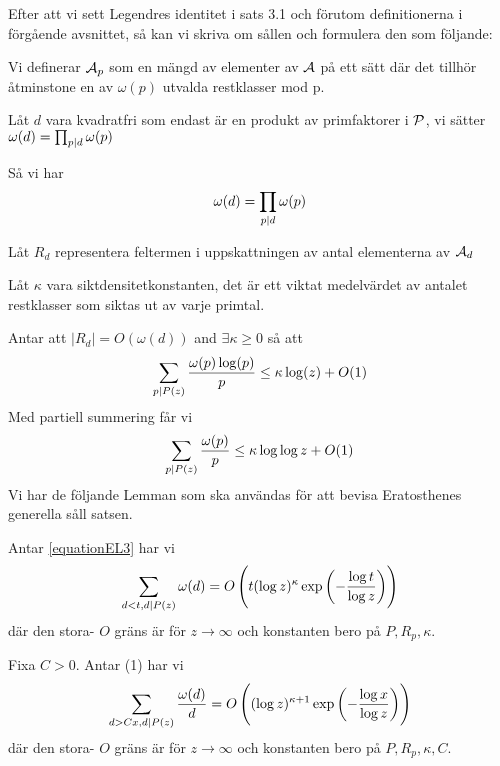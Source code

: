 Efter att vi sett Legendres identitet i sats 3.1 och förutom definitionerna i förgående avsnittet, så kan vi skriva om sållen och formulera den som följande:

Vi definerar $\A_{p}$ som en mängd av elementer av $ \A $ på ett sätt där det tillhör åtminstone en av $\omega(p)$ utvalda restklasser mod p.

Låt $ d $ vara kvadratfri som endast är en produkt av primfaktorer i $ \P $, vi sätter $\omega(d)=\prod_{p \divides d} \omega(p)$

Så vi har
\[\omega(d)=\prod_{p\divides d}\omega(p)\]

Låt $ R_{d} $ representera feltermen i uppskattningen av antal elementerna av $ \A_{d} $ 


Låt $ \kappa $ vara siktdensitetkonstanten, det är ett viktat medelvärdet av antalet restklasser som siktas ut av varje primtal.


Antar att $ \vert R_{d}\vert=O(\omega(d))$ and $ \exists\kappa\geq 0 $ så att
\begin{equation}
\label{equationEL3}
\sum_{p\divides P(z)}\frac{\omega(p)\log(p)}{p}\leq \kappa \log(z)+O(1)
\end{equation}  
Med partiell summering får vi
\[\sum_{p\divides P(z)}\frac{\omega(p)}{p}\leq\kappa\log\log z+O(1)\]
   Vi har de följande Lemman som ska användas för att bevisa Eratosthenes generella såll satsen.
\begin{lemma}
     Antar \ref{equationEL3} har vi
$$
\sum_{d<t, d \divides P(z)} \omega(d)=O\left(t(\log z)^{\kappa} \exp \left(-\frac{\log t}{\log z}\right)\right)
$$
där den stora- $O$ gräns är för $z \rightarrow \infty$ och konstanten bero på $P, R_{p}, \kappa$.
\end{lemma}
\begin{lemma}
    Fixa $C>0 .$ Antar (1) har vi
$$
\sum_{d>C x, d \divides P(z)} \frac{\omega(d)}{d}=O\left((\log z)^{\kappa+1} \exp \left(-\frac{\log x}{\log z}\right)\right)
$$
där den stora- $O$ gräns är för $z \rightarrow \infty$ och konstanten bero på $P, R_{p}, \kappa, C .$
 
\end{lemma}

